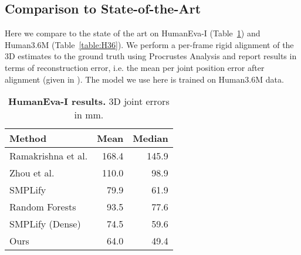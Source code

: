 \documentclass[10pt,twocolumn,letterpaper]{article}
\begin{document}
\vspace{-0.3em}

\subsection{Comparison to State-of-the-Art}
Here we compare to the state of the art on HumanEva-I (Table~\ref{table:heva}) and Human3.6M (Table~\ref{table:H36}).
We perform a per-frame rigid alignment of the 3D estimates to the ground truth using Procrustes Analysis
and report results in terms of reconstruction error, i.e. the mean per joint position error after alignment 
(given in ). The model we use here is trained on Human3.6M data.

\begin{table}[t]
\centering
\begin{tabular}{lrr}
\hline
Method & Mean & Median \\
\hline
Ramakrishna et al. \cite{ramakrishna2012reconstructing}   & 168.4 & 145.9\\
Zhou et al.        \cite{zhou_convexrelaxation_cvpr2015}  & 110.0 &  98.9\\
SMPLify            \cite{bogo_smpl_eccv16}                &  79.9 &  61.9\\
Random Forests     \cite{Lassner:UP:2017}                 &  93.5 &  77.6\\
SMPLify (Dense)    \cite{Lassner:UP:2017}                 &  74.5 &  59.6\\
Ours                                                      &  64.0 &  49.4\\
\hline
\end{tabular}
\caption{{\bf HumanEva-I results.} 3D joint errors in mm. }
\label{table:heva}
\end{table}
\end{document}
